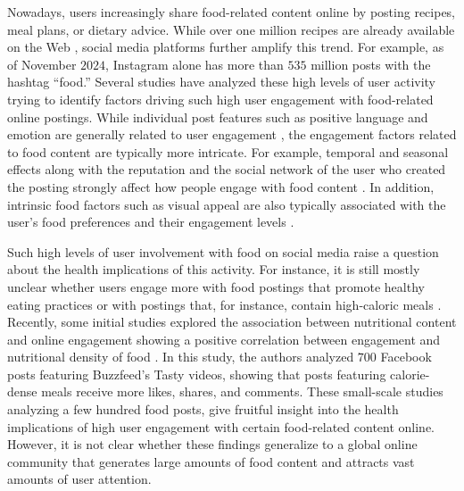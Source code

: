 Nowadays, users increasingly share food-related content online by posting recipes, meal plans, or dietary advice.
While over one million recipes are already available on the Web \cite{salvador_learning_2017}, social media platforms further amplify this trend. 
For example, as of November $2024$, Instagram alone has more than $535$ million posts with the hashtag ``food.'' 
Several studies have analyzed these high levels of user activity trying to identify factors driving such high user engagement with food-related online postings. While individual post features such as positive language and emotion are generally related to user engagement \cite{barklamb_learning_2020}, the engagement factors related to food content are typically more intricate.
For example, temporal and seasonal effects along with the reputation and the social network of the user who created the posting strongly affect how people engage with food content \cite{rokicki_how_2017, starke_nudging_2021}. 
In addition, intrinsic food factors such as visual appeal are also typically associated with the user's food preferences and their engagement levels \cite{lee_visual_2023}. 

Such high levels of user involvement with food on social media raise a question about the health implications of this activity. For instance, it is still mostly unclear whether users engage more with food postings that promote healthy eating practices or with postings that, for instance, contain high-caloric meals \cite{garaus2021unhealthy}.
Recently, some initial studies explored the association between nutritional content and online engagement showing a positive correlation between engagement and nutritional density of food \cite{pancer_content_2022}. 
In this study, the authors analyzed $700$ Facebook posts featuring Buzzfeed's Tasty videos, showing that posts featuring calorie-dense meals receive more likes, shares, and comments.
These small-scale studies analyzing a few hundred food posts, give fruitful insight into the health implications of high user engagement with certain food-related content online.
However, it is not clear whether these findings generalize to a global online community that generates large amounts of food content and attracts vast amounts of user attention.

